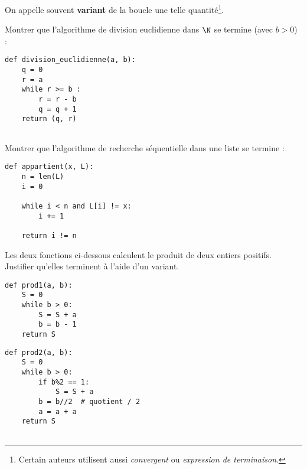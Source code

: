 On appelle souvent {\bf variant} de la boucle une telle quantité\footnote{Certain auteurs utilisent aussi \emph{convergent} ou \emph{expression de terminaison}.}.

 
 \exercice{} Montrer que l'algorithme de division euclidienne dans $\N$ se termine (avec  $b>0$) :
 \begin{minipage}{0.5\linewidth}
 \begin{lstlisting}
def division_euclidienne(a, b):
    q = 0
    r = a
    while r >= b :
        r = r - b
        q = q + 1
    return (q, r)
 
 \end{lstlisting}
 \end{minipage}
 \hskip 1cm\hfill 
 \begin{minipage}{0.5\linewidth} 
 \end{minipage}
 \exercice{} Montrer que l'algorithme de recherche séquentielle dans une liste se termine :
 \begin{minipage}{0.5\linewidth}
 \begin{lstlisting}
def appartient(x, L):
    n = len(L)
    i = 0

    while i < n and L[i] != x:
        i += 1

    return i != n 
 \end{lstlisting}
 \end{minipage}
 \hskip 1cm
 \hfill 
 \begin{minipage}{0.5\linewidth} 
 \end{minipage}
\vskip -0.3cm

\exercice{}

Les deux fonctions ci-dessous calculent le produit de deux entiers positifs. Justifier qu'elles terminent à l'aide d'un variant.

\begin{minipage}{0.4\linewidth} 
 \begin{lstlisting}
def prod1(a, b):
    S = 0
    while b > 0:
        S = S + a
        b = b - 1
    return S
\end{lstlisting}

\end{minipage}
\hfill 
\begin{minipage}{0.47\linewidth} 
\begin{lstlisting}
def prod2(a, b):
    S = 0
    while b > 0:
        if b%2 == 1:
            S = S + a
        b = b//2  # quotient / 2 
        a = a + a
    return S
    

\end{lstlisting}

\end{minipage}

